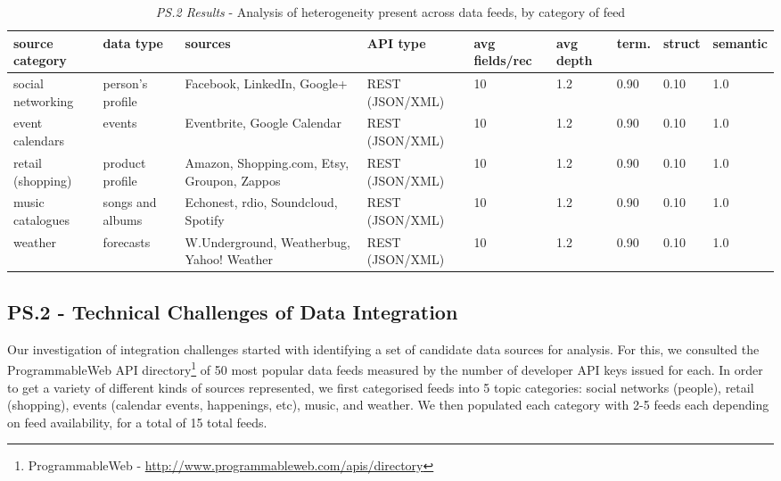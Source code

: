 \documentclass{sigchi}
\begin{document}
\begin{table}
\small
\begin{tabular}{| p{2.0cm} | p{1.5cm} | p{3.6cm} | p{2cm} | p{2cm} | l | l | l | l |}
\hline
source category  & data type & sources & API type & avg fields/rec & avg depth & term. & struct & semantic \\
\hline
social networking  & person's profile & Facebook, LinkedIn, Google+ & REST (JSON/XML) & 10 & 1.2 & 0.90 & 0.10 & 1.0 \\
event calendars & events & Eventbrite, Google Calendar  & REST (JSON/XML) & 10 & 1.2 & 0.90 & 0.10 & 1.0 \\
retail (shopping)  & product profile & Amazon, Shopping.com, Etsy, Groupon, Zappos  & REST (JSON/XML) & 10 & 1.2 & 0.90 & 0.10 & 1.0 \\
music catalogues & songs and albums & Echonest, rdio, Soundcloud, Spotify  & REST (JSON/XML) & 10 & 1.2 & 0.90 & 0.10 & 1.0 \\
weather & forecasts & W.Underground, Weatherbug, Yahoo! Weather & REST (JSON/XML) & 10 & 1.2 & 0.90 & 0.10 & 1.0 \\
\hline
\end{tabular}
\caption{\emph{PS.2 Results} - Analysis of heterogeneity present across data feeds, by category of feed}\label{tbl:prestudy2}

\end{table}

\subsection{PS.2 - Technical Challenges of Data Integration}
Our investigation of integration challenges started with identifying a set of candidate data sources for analysis.  For this, we consulted the ProgrammableWeb API directory\footnote{ProgrammableWeb - \url{http://www.programmableweb.com/apis/directory}} of 50 most popular data feeds measured by the number of developer API keys issued for each.  In order to get a variety of different kinds of sources represented, we first categorised feeds into 5 topic categories: social networks (people), retail (shopping), events (calendar events, happenings, etc), music, and weather. We then populated each category with 2-5 feeds each depending on feed availability, for a total of 15 total feeds.  
\end{document}
